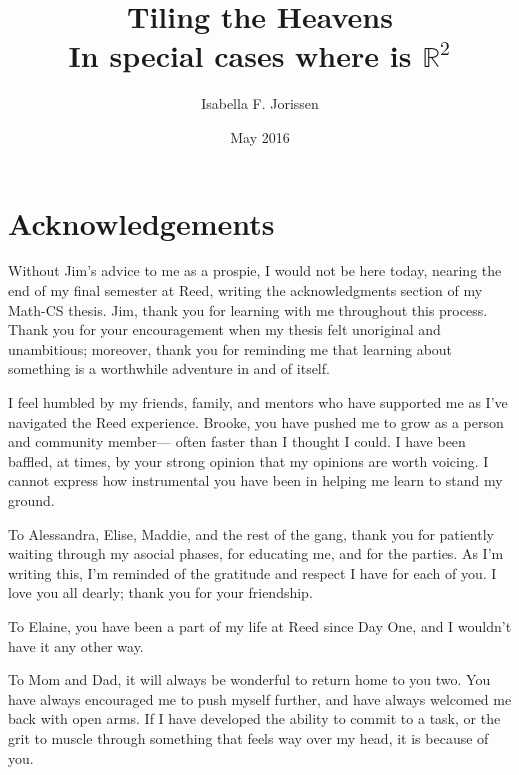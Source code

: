 \documentclass[12pt,twoside]{reedthesis}
\title{Tiling the Heavens \\  In special cases where \say{the Heavens} is $\mathds{R}^2$}
\author{Isabella F. Jorissen}
\date{May 2016}
\begin{document}
  \maketitle
  \frontmatter %
  \pagestyle{empty} %

    \chapter*{Acknowledgements}
    Without Jim's advice to me as a prospie, I would not be here today, nearing the end of my final semester at Reed, writing the acknowledgments section of my Math-CS thesis. Jim, thank you for learning with me throughout this process. Thank you for your encouragement when my thesis felt unoriginal and unambitious; moreover, thank you for reminding me that learning about something  is a worthwhile adventure in and of itself.\par

    I feel humbled by my friends, family, and mentors who have supported me as I've navigated the Reed experience. Brooke, you have pushed me to grow as a person and community member--- often faster than I thought I could. I have been baffled, at times, by your strong opinion that my opinions are worth voicing. I cannot express how instrumental you have been in helping me learn to stand my ground.\par

    To Alessandra, Elise, Maddie, and the rest of the gang, thank you for patiently waiting through my asocial phases, for educating me, and for the parties. As I'm writing this, I'm reminded of the gratitude and respect I have for each of you. I love you all dearly; thank you for your friendship.\par

    To Elaine, you have been a part of my life at Reed since Day One, and I wouldn't have it any other way.\par

    To Mom and Dad, it will always be wonderful to return home to you two. You have always encouraged me to push myself further, and have always welcomed me back with open arms. If I have developed the ability to commit to a task, or the grit to muscle through something that feels way over my head, it is because of you. \par
\end{document}
